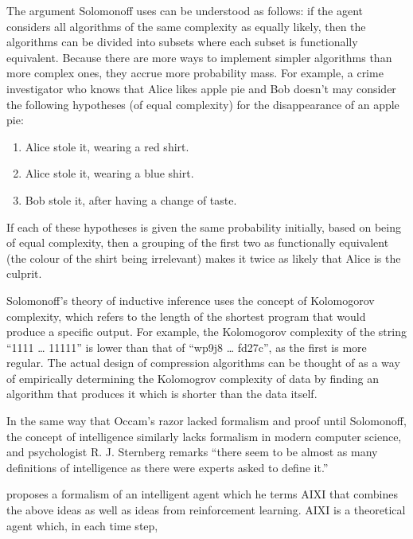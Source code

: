 The argument Solomonoff uses can be understood as follows: if the agent considers all algorithms of the same complexity as equally likely, then the algorithms can be divided into subsets where each subset is functionally equivalent. Because there are more ways to implement simpler algorithms than more complex ones, they accrue more probability mass. For example, a crime investigator who knows that Alice likes apple pie and Bob doesn’t may consider the following hypotheses (of equal complexity) for the disappearance of an apple pie:


\begin{enumerate}
    \item Alice stole it, wearing a red shirt.
    \item Alice stole it, wearing a blue shirt.
    \item Bob stole it, after having a change of taste.
\end{enumerate}

If each of these hypotheses is given the same probability initially, based on being of equal complexity, then a grouping of the first two as functionally equivalent (the colour of the shirt being irrelevant) makes it twice as likely that Alice is the culprit.

Solomonoff’s theory of inductive inference uses the concept of Kolomogorov complexity, which refers to the length of the shortest program that would produce a specific output. For example, the Kolomogorov complexity of the string “1111 … 11111” is lower than that of “wp9j8 … fd27c”, as the first is more regular. The actual design of compression algorithms can be thought of as a way of empirically determining the Kolomogrov complexity of data by finding an algorithm that produces it which is shorter than the data itself.

In the same way that Occam’s razor lacked formalism and proof until Solomonoff, the concept of intelligence similarly lacks formalism in modern computer science, and psychologist R. J. Sternberg remarks “there seem to be almost as many definitions of intelligence as there were experts asked to define it.” \autocite{Legg2007}

\textcite{Hutter2000} proposes a formalism of an intelligent agent which he terms AIXI that combines the above ideas as well as ideas from reinforcement learning. AIXI is a theoretical agent which, in each time step,

